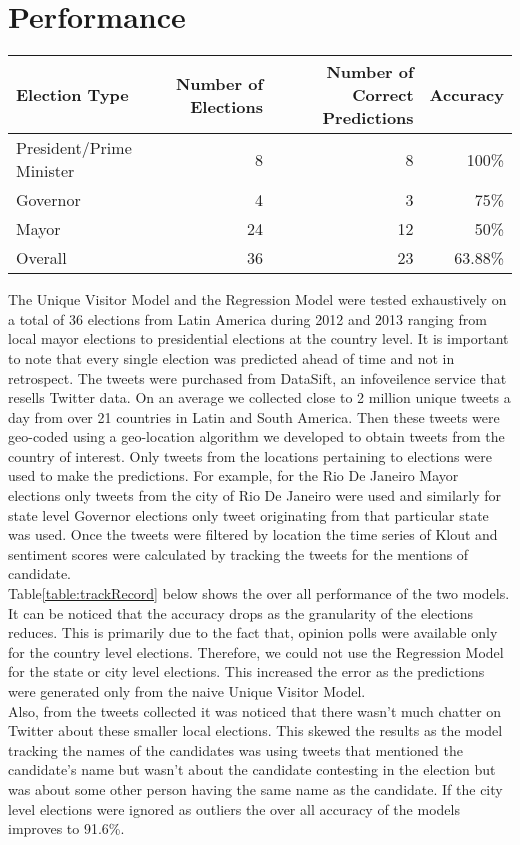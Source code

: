 \section{Performance}
\begin{table*}
        \centering
        \begin{tabular}{| l | r | r | r |}
        \hline
        Election Type & Number of Elections & Number of Correct Predictions & Accuracy\\
        \hline
        President/Prime Minister & 8 & 8 & 100\%\\
        Governor & 4 & 3 & 75\%\\
        Mayor & 24 & 12 & 50\%\\
        Overall & 36 & 23 & 63.88\%\\
        \hline
        \end{tabular}
        \caption{Track Record of Prediction Algorithms}
        \label{table:trackRecord}
\end{table*}
The Unique Visitor Model and the Regression Model were tested exhaustively on a total of 36 elections from Latin America during 2012 and 2013 ranging from local mayor elections to presidential elections at the country level.
It is important to note that every single election was predicted ahead of time and not in retrospect.
The tweets were purchased from DataSift, an infoveilence service that resells Twitter data.
On an average we collected close to 2 million unique tweets a day from over 21 countries in Latin and South America.
Then these tweets were geo-coded using a geo-location algorithm we developed to obtain tweets from the country of interest.
Only tweets from the locations pertaining to elections were used to make the predictions.
For example, for the Rio De Janeiro Mayor elections only tweets from the city of Rio De Janeiro were used and similarly for state level Governor elections only tweet originating from that particular state was used.
Once the tweets were filtered by location the time series of Klout and sentiment scores were calculated by tracking the tweets for the mentions of candidate.\\
Table\ref{table:trackRecord} below shows the over all performance of the two models. 
It can be noticed that the accuracy drops as the granularity of the elections reduces. 
This is primarily due to the fact that, opinion polls were available only for the country level elections.
Therefore, we could not use the Regression Model for the state or city level elections.
This increased the error as the predictions were generated only from the naive Unique Visitor Model.\\
Also, from the tweets collected it was noticed that there wasn't much chatter on Twitter about these smaller local elections.
This skewed the results as the model tracking the names of the candidates was using tweets that mentioned the candidate's name but wasn't about the candidate contesting in the election but was about some other person having the same name as the candidate.
If the city level elections were ignored as outliers the over all accuracy of the models improves to 91.6\%.
